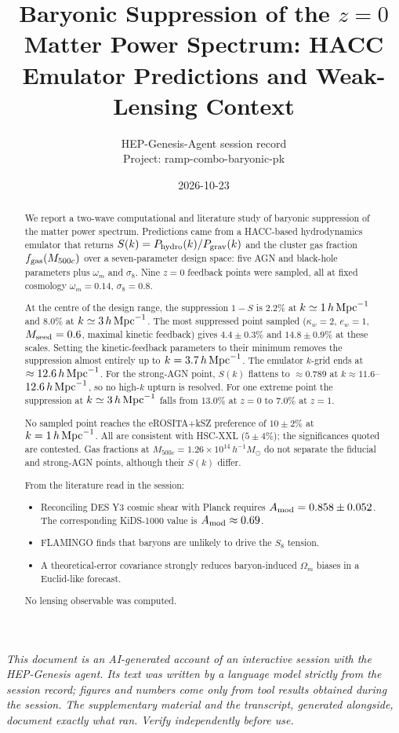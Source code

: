 \documentclass[11pt,a4paper]{article}
\title{Baryonic Suppression of the $z=0$ Matter Power Spectrum: HACC Emulator Predictions and Weak-Lensing Context}
\author{HEP-Genesis-Agent session record \\ \small Project: ramp-combo-baryonic-pk}
\date{2026-10-23}
\begin{document}
\maketitle
\noindent\textit{\small This document is an AI-generated account of an interactive session with the HEP-Genesis agent. Its text was written by a language model strictly from the session record; figures and numbers come only from tool results obtained during the session. The supplementary material and the transcript, generated alongside, document exactly what ran. Verify independently before use.}
\vspace{1em}

\begin{abstract}
We report a two-wave computational and literature study of baryonic suppression of the matter power spectrum. Predictions came from a HACC-based hydrodynamics emulator that returns $S(k)=P_{\rm hydro}(k)/P_{\rm grav}(k)$ and the cluster gas fraction $f_{\rm gas}(M_{500c})$ over a seven-parameter design space: five AGN and black-hole parameters plus $\omega_m$ and $\sigma_8$. Nine $z=0$ feedback points were sampled, all at fixed cosmology $\omega_m=0.14$, $\sigma_8=0.8$.

At the centre of the design range, the suppression $1-S$ is $2.2\%$ at $k\simeq1\,h\,{\rm Mpc}^{-1}$ and $8.0\%$ at $k\simeq3\,h\,{\rm Mpc}^{-1}$. The most suppressed point sampled ($\kappa_w=2$, $e_w=1$, $M_{\rm seed}=0.6$, maximal kinetic feedback) gives $4.4\pm0.3\%$ and $14.8\pm0.9\%$ at these scales. Setting the kinetic-feedback parameters to their minimum removes the suppression almost entirely up to $k=3.7\,h\,{\rm Mpc}^{-1}$. The emulator $k$-grid ends at $\approx12.6\,h\,{\rm Mpc}^{-1}$. For the strong-AGN point, $S(k)$ flattens to $\approx0.789$ at $k\approx11.6$--$12.6\,h\,{\rm Mpc}^{-1}$, so no high-$k$ upturn is resolved. For one extreme point the suppression at $k\simeq3\,h\,{\rm Mpc}^{-1}$ falls from $13.0\%$ at $z=0$ to $7.0\%$ at $z=1$.

No sampled point reaches the eROSITA+kSZ preference of $10\pm2\%$ at $k=1\,h\,{\rm Mpc}^{-1}$. All are consistent with HSC-XXL ($5\pm4\%$); the significances quoted are contested. Gas fractions at $M_{500c}=1.26\times10^{14}\,h^{-1}M_\odot$ do not separate the fiducial and strong-AGN points, although their $S(k)$ differ.

From the literature read in the session:
\begin{itemize}
\item Reconciling DES Y3 cosmic shear with Planck requires $A_{\rm mod}=0.858\pm0.052$. The corresponding KiDS-1000 value is $A_{\rm mod}\approx0.69$.
\item FLAMINGO finds that baryons are unlikely to drive the $S_8$ tension.
\item A theoretical-error covariance strongly reduces baryon-induced $\Omega_m$ biases in a Euclid-like forecast.
\end{itemize}
No lensing observable was computed.
\end{abstract}
\end{document}
